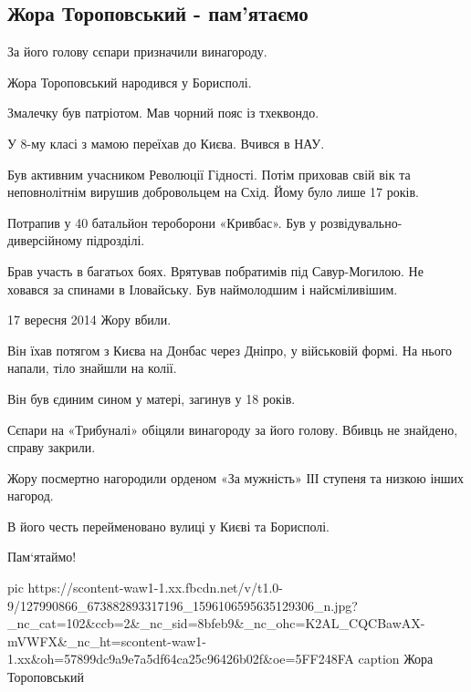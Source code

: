 
 
 
 
 

\subsection{Жора Тороповський - пам'ятаємо}


За його голову сєпари призначили винагороду.

Жора Тороповський народився у Борисполі.

Змалечку був патріотом. Мав чорний пояс із тхеквондо. 

У 8-му класі з мамою переїхав до Києва. Вчився в НАУ.

Був активним учасником Революції Гідності. Потім приховав свій вік та
неповнолітнім вирушив добровольцем на Схід. Йому було лише 17 років.

Потрапив у 40 батальйон тероборони «Кривбас». Був у розвідувально-диверсійному підрозділі.

Брав участь в багатьох боях. Врятував побратимів під Савур-Могилою. Не ховався
за спинами в Іловайську. Був наймолодшим і найсміливішим.

17 вересня 2014 Жору вбили.

Він їхав потягом з Києва на Донбас через Дніпро, у військовій формі. На нього
напали, тіло знайшли на колії.

Він був єдиним сином у матері, загинув у 18 років.

Сєпари на «Трибуналі» обіцяли винагороду за його голову. Вбивць не знайдено, справу закрили.

Жору посмертно нагородили орденом «За мужність» ІІІ ступеня та низкою інших нагород.

В його честь перейменовано вулиці у Києві та Борисполі.

Пам‘ятаймо!

\ifcmt
pic https://scontent-waw1-1.xx.fbcdn.net/v/t1.0-9/127990866_673882893317196_1596106595635129306_n.jpg?_nc_cat=102&ccb=2&_nc_sid=8bfeb9&_nc_ohc=K2AL_CQCBawAX-mVWFX&_nc_ht=scontent-waw1-1.xx&oh=57899dc9a9e7a5df64ca25c96426b02f&oe=5FF248FA
caption Жора Тороповський
\fi
